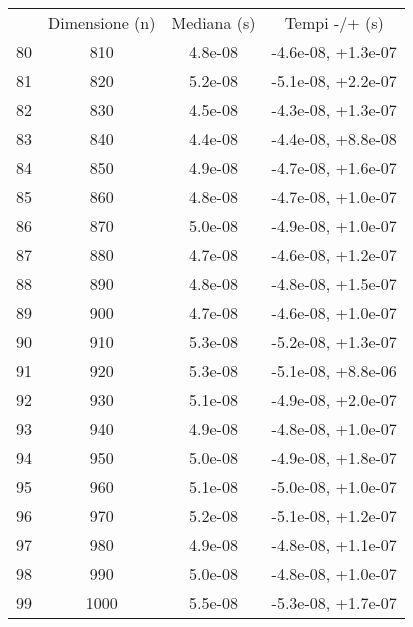\begin{table}
\centering
\begin{adjustbox}{width=1\textwidth/2}
\begin{tabular}{|c|c|c|c|}
\hline
 & Dimensione (n) & Mediana (s) & Tempi -/+ (s) \\
80 & 810 & 4.8e-08 & -4.6e-08, +1.3e-07 \\
\cline{1-4}
81 & 820 & 5.2e-08 & -5.1e-08, +2.2e-07 \\
\cline{1-4}
82 & 830 & 4.5e-08 & -4.3e-08, +1.3e-07 \\
\cline{1-4}
83 & 840 & 4.4e-08 & -4.4e-08, +8.8e-08 \\
\cline{1-4}
84 & 850 & 4.9e-08 & -4.7e-08, +1.6e-07 \\
\cline{1-4}
85 & 860 & 4.8e-08 & -4.7e-08, +1.0e-07 \\
\cline{1-4}
86 & 870 & 5.0e-08 & -4.9e-08, +1.0e-07 \\
\cline{1-4}
87 & 880 & 4.7e-08 & -4.6e-08, +1.2e-07 \\
\cline{1-4}
88 & 890 & 4.8e-08 & -4.8e-08, +1.5e-07 \\
\cline{1-4}
89 & 900 & 4.7e-08 & -4.6e-08, +1.0e-07 \\
\cline{1-4}
90 & 910 & 5.3e-08 & -5.2e-08, +1.3e-07 \\
\cline{1-4}
91 & 920 & 5.3e-08 & -5.1e-08, +8.8e-06 \\
\cline{1-4}
92 & 930 & 5.1e-08 & -4.9e-08, +2.0e-07 \\
\cline{1-4}
93 & 940 & 4.9e-08 & -4.8e-08, +1.0e-07 \\
\cline{1-4}
94 & 950 & 5.0e-08 & -4.9e-08, +1.8e-07 \\
\cline{1-4}
95 & 960 & 5.1e-08 & -5.0e-08, +1.0e-07 \\
\cline{1-4}
96 & 970 & 5.2e-08 & -5.1e-08, +1.2e-07 \\
\cline{1-4}
97 & 980 & 4.9e-08 & -4.8e-08, +1.1e-07 \\
\cline{1-4}
98 & 990 & 5.0e-08 & -4.8e-08, +1.0e-07 \\
\cline{1-4}
99 & 1000 & 5.5e-08 & -5.3e-08, +1.7e-07 \\
\cline{1-4}
\end{tabular}
\end{adjustbox}
\end{table}
